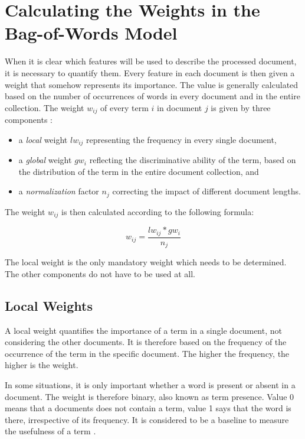 \documentclass[11pt,openany,executivepaper]{book}
\begin{document}
\section{Calculating the Weights in the Bag-of-Words Model}
When it is clear which features will be used to describe the processed document, it is necessary to quantify them. Every feature in each document is then given a weight that somehow represents its importance. The value is generally calculated based on the number of occurrences of words in every document and in the entire collection. The weight $w_{i j}$ of every term $i$ in document $j$ is given by three components \cite{236}:

\begin{itemize}
  \item a \textit{local} weight $l w_{i j}$ representing the frequency in every single document,
  \item a \textit{global} weight $g w_{i}$ reflecting the discriminative ability of the term, based on the distribution of the term in the entire document collection, and
  \item a \textit{normalization} factor $n_{j}$ correcting the impact of different document lengths.
\end{itemize}

The weight $w_{i j}$ is then calculated according to the following formula:


\begin{equation*}
w_{i j}=\frac{l w_{i j} * g w_{i}}{n_{j}} \tag{3.4}
\end{equation*}


The local weight is the only mandatory weight which needs to be determined. The other components do not have to be used at all.

\subsection{Local Weights}
A local weight quantifies the importance of a term in a single document, not considering the other documents. It is therefore based on the frequency of the occurrence of the term in the specific document. The higher the frequency, the higher is the weight.

In some situations, it is only important whether a word is present or absent in a document. The weight is therefore binary, also known as term presence. Value 0 means that a documents does not contain a term, value 1 says that the word is there, irrespective of its frequency. It is considered to be a baseline to measure the usefulness of a term \cite{252}.
\end{document}
